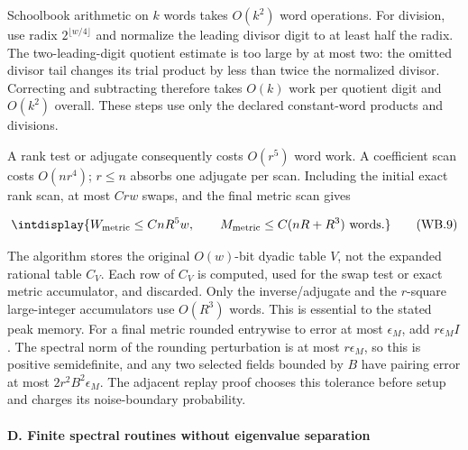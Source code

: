 
Schoolbook arithmetic on \(k\) words takes \(O(k^2)\) word operations. For division, use radix \(2^{\lfloor w/4\rfloor}\) and normalize the leading divisor digit to at least half the radix. The two-leading-digit quotient estimate is too large by at most two: the omitted divisor tail changes its trial product by less than twice the normalized divisor. Correcting and subtracting therefore takes \(O(k)\) work per quotient digit and \(O(k^2)\) overall. These steps use only the declared constant-word products and divisions.



A rank test or adjugate consequently costs \(O(r^5)\) word work. A coefficient scan costs \(O(nr^4)\); \(r\le n\) absorbs one adjugate per scan. Including the initial exact rank scan, at most \(Crw\) swaps, and the final metric scan gives


\begingroup\renewcommand{\theHequation}{intdisplay.789}
\begin{equation}
\intdisplay{
W_{\rm metric}\le CnR^5w,\qquad
M_{\rm metric}\le C(nR+R^3)\text{ words}.
}
\tag{WB.9}
\label{int:eq-0381-wb-9}
\end{equation}
\endgroup


The algorithm stores the original \(O(w)\)-bit dyadic table \(V\), not the expanded rational table \(C_V\). Each row of \(C_V\) is computed, used for the swap test or exact metric accumulator, and discarded. Only the inverse/adjugate and the \(r\)-square large-integer accumulators use \(O(R^3)\) words. This is essential to the stated peak memory. For a final metric rounded entrywise to error at most \(\epsilon_M\), add \(r\epsilon_M I\). The spectral norm of the rounding perturbation is at most \(r\epsilon_M\), so this is positive semidefinite, and any two selected fields bounded by \(B\) have pairing error at most \(2r^2B^2\epsilon_M\). The adjacent replay proof chooses this tolerance before setup and charges its noise-boundary probability.


\paragraph{D. Finite spectral routines without eigenvalue separation}

\mbox{}\par\smallskip

